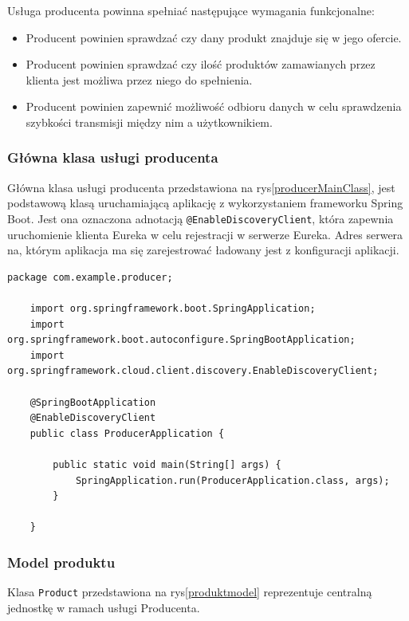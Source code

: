 Usługa producenta powinna spełniać następujące wymagania funkcjonalne:

\begin{itemize}
    \item Producent powinien sprawdzać czy dany produkt znajduje się w jego ofercie.
    \item Producent powinien sprawdzać czy ilość produktów zamawianych przez klienta jest możliwa przez niego do spełnienia. 
    \item Producent powinien zapewnić możliwość odbioru danych w celu sprawdzenia szybkości transmisji między nim a użytkownikiem.
\end{itemize}


\subsubsection{Główna klasa usługi producenta}

Główna klasa usługi producenta przedstawiona na rys\ref{producerMainClass}, jest podstawową klasą uruchamiającą aplikację z wykorzystaniem frameworku Spring Boot. Jest ona oznaczona adnotacją \verb|@EnableDiscoveryClient|, która zapewnia uruchomienie klienta Eureka w celu rejestracji w serwerze Eureka. Adres serwera na, którym aplikacja ma się zarejestrować  ładowany jest z konfiguracji aplikacji.

\begin{lstlisting}[caption=Główna klasa usługi producenta, label=producerMainClass]
    package com.example.producer;

    import org.springframework.boot.SpringApplication;
    import org.springframework.boot.autoconfigure.SpringBootApplication;
    import org.springframework.cloud.client.discovery.EnableDiscoveryClient;
    
    @SpringBootApplication
    @EnableDiscoveryClient
    public class ProducerApplication {
    
        public static void main(String[] args) {
            SpringApplication.run(ProducerApplication.class, args);
        }
    
    }
\end{lstlisting}

\subsubsection{Model produktu}

Klasa \verb|Product| przedstawiona na rys\ref{produktmodel} reprezentuje centralną jednostkę w ramach usługi Producenta.

